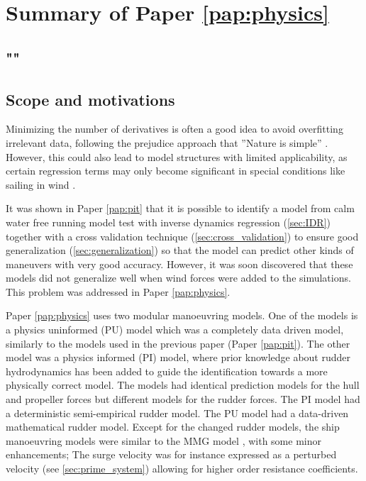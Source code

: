 \section{Summary of Paper \ref{pap:physics}}
\subsection*{""}
\subsection*{Scope and motivations}

\textcolor{ref}{
Minimizing the number of derivatives is often a good idea to avoid overfitting irrelevant data, following the prejudice approach that ''Nature is simple'' \cite{ljungPerspectivesSystemIdentification2010}. However, this could also lead to model structures with limited applicability, as certain regression terms may only become significant in special conditions like sailing in wind \cite{abkowitzMEASUREMENTHYDRODYNAMICCHARACTERISTICS1980}.
}

It was shown in Paper \ref{pap:pit} that it is possible to identify a model from calm water free running model test with inverse dynamics regression (\autoref{sec:IDR}) together with a cross validation technique (\autoref{sec:cross_validation}) to ensure good generalization (\autoref{sec:generalization}) so that the model can predict other kinds of maneuvers with very good accuracy. However, it was soon discovered that these models did not generalize well when wind forces were added to the simulations. This problem was addressed in Paper \ref{pap:physics}.

Paper \ref{pap:physics} uses two modular manoeuvring models. One of the models is a physics uninformed (PU) model which was a completely data driven model, similarly to the models used in the previous paper (Paper \ref{pap:pit}).
The other model was a physics informed (PI) model, where prior knowledge about rudder hydrodynamics has been added to guide the identification towards a more physically correct model. 
The models had identical prediction models for the hull and propeller forces but different models for the rudder forces. The PI model had a deterministic semi-empirical rudder model. The PU model had a data-driven mathematical rudder model. Except for the changed rudder models, the ship manoeuvring models were similar to the MMG model \cite{yasukawaIntroductionMMGStandard2015}, with some minor enhancements; The surge velocity was for instance expressed as a perturbed velocity (see \autoref{sec:prime_system}) allowing for higher order resistance coefficients.


